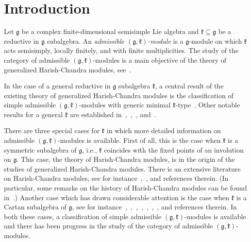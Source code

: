 \documentclass{tglat2e}
\theoremstyle{definition}
\theoremstyle{remark}
\newcommand{\kk}{\mathfrak{k}}
\renewcommand{\gg}{\mathfrak{g}}
\begin{document}
\section {Introduction}
\label{sec:intro}

Let $\mathfrak{g}$ be a complex finite-dimensional semisimple Lie algebra and $\mathfrak{k} \subseteq \mathfrak{g}$ be a reductive in $\mathfrak{g}$ subalgebra.  An \emph{admissible $(\mathfrak{g},\mathfrak{k})$-module} is a $\mathfrak{g}$-module on which $\mathfrak{k}$ acts semisimply, locally finitely, and with finite multiplicities.  
The study of the category of admissible $(\gg,\kk)$-modules is a main objective of the theory of generalized Harish-Chandra modules, see~\cite{PZ1}.

In the case of a general reductive in $\mathfrak{g}$ subalgebra $\mathfrak{k}$, a central result of the existing theory of generalized Harish-Chandra modules 
is the classification of simple admissible $(\mathfrak{g},\mathfrak{k})$-modules with generic minimal $\mathfrak{k}$-type~\cite{PZ1}.  Other notable results for a general $\mathfrak{k}$ are established in~\cite{PSZ},~\cite{PS1},~\cite{PZ2}, and~\cite{PZ6}.

There are three special cases for $\mathfrak{k}$ in which more detailed information on admissible $(\mathfrak{g},\mathfrak{k})$-modules is available.  First of all, this is the case when $\mathfrak{k}$ is a symmetric subalgebra of $\mathfrak{g}$, i.e., $\mathfrak{k}$ coincides with the fixed points of an involution on $\mathfrak{g}$.  This case, the theory of Harish-Chandra modules, is in the origin of the studies of generalized Harish-Chandra modules.  There is an extensive literature on Harish-Chandra modules, see for instance~\cite{V},~\cite{KV}, and references therein.  (In particular, some remarks on the history of Harish-Chandra modules can be found in~\cite{KV}.)  Another case which has drawn considerable attention is the case when $\mathfrak{k}$ is a Cartan subalgebra of $\mathfrak{g}$, see for instance~\cite{BL},~\cite{BBL},~\cite{F},~\cite{Fe},~\cite{M},~\cite{GS1},~\cite{GS2}, and references therein.  In both these cases, a classification of simple admissible $(\mathfrak{g},\mathfrak{k})$-modules is available and there has been progress in the study of the category of admissible $(\mathfrak{g},\mathfrak{k})$-modules.
\end{document}
